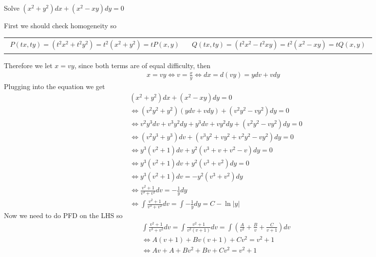 \documentclass[notes]{subfiles}
\begin{document}
\begin{exercise}
    Solve $(x^2 + y^2)dx + (x^2 - xy)dy = 0$
\end{exercise}
\begin{solution}
    First we should check homogeneity so \\
    \begin{tabularx}{\textwidth}{X X}
        \begin{align*}
        P(tx, ty) = (t^2x^2 + t^2y^2) = t^2(x^2 + y^2) = tP(x, y)
        \end{align*}
        &
        \begin{align*}
        Q(tx, ty) = (t^2x^2 - t^2xy) = t^2(x^2 - xy) = tQ(x, y)
        \end{align*}
    \end{tabularx}
    Therefore we let $x = vy$, since both terms are of equal difficulty, then
    \begin{align*}
        x = vy \iff v = \frac{x}{y} \iff dx = d(vy) = ydv + vdy
    \end{align*}
    Plugging into the equation we get
    \begin{align*}
        &(x^2 + y^2)dx + (x^2 - xy)dy = 0 \\
        &\iff (v^2y^2 + y^2)(ydv + vdy) + (v^2y^2 - vy^2)dy = 0 \\
        &\iff v^2y^3dv + v^3y^2dy + y^3dv + vy^2dy + (v^2y^2 - vy^2)dy = 0 \\
        &\iff (v^2y^3 + y^3)dv + (v^3y^2 + vy^2 + v^2y^2 - vy^2)dy = 0 \\
        &\iff y^3(v^2 + 1)dv + y^2(v^3 + v + v^2 - v)dy = 0 \\
        &\iff y^3(v^2 + 1)dv + y^2(v^3 + v^2)dy = 0 \\
        &\iff y^3(v^2 + 1)dv = -y^2(v^3 + v^2)dy \\
        &\iff \frac{v^2 + 1}{v^3 + v^2}dv = -\frac{1}{y}dy \\
        &\iff \int \frac{v^2 + 1}{v^3 + v^2}dv = \int -\frac{1}{y}dy = C - \ln|y|
    \end{align*}
    Now we need to do PFD on the LHS so
    \begin{align*}
        &\int \frac{v^2 + 1}{v^3 + v^2}dv = \int \frac{v^2 + 1}{v^2(v + 1)}dv = \int \left( \frac{A}{v^2} + \frac{B}{v} + \frac{C}{v + 1} \right)dv \\
        &\iff A(v + 1) + Bv(v + 1) + Cv^2 = v^2 + 1 \\
        &\iff Av + A + Bv^2 + Bv + Cv^2 = v^2 + 1 \\

\end{align*}
\end{solution}
\end{document}
